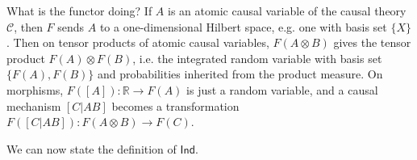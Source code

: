 \documentclass[sigconf]{acmart}
\newcommand{\Cat}[1]{\mathsf{#1}}
\def\Ind{\Cat{Ind}}
\def\Rand{\Cat{Rand}}
\def\Stoch{\Cat{Stoch}}
\begin{document}





What is the functor doing? If $A$ is an atomic causal variable of the causal theory $\mathcal{C}$, then $F$ sends $A$ to a one-dimensional Hilbert space, e.g. one with basis set $\{X\}$. Then on tensor products of atomic causal variables, $F(A \otimes B)$ gives the tensor product $F(A) \otimes F(B)$, i.e. the integrated random variable with basis set $\{F(A), F(B)\}$ and probabilities inherited from the product measure. On morphisms, $F([A]) : \mathbb{R} \to F(A)$ is just a random variable, and a causal mechanism $[C|AB]$ becomes a transformation $F([C|AB]) : F(A \otimes B) \to F(C)$.

We can now state the definition of $\Ind$.
\end{document}
